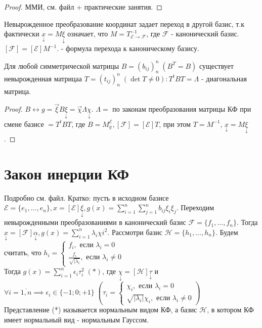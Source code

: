 \documentclass[../main.tex]{subfiles}
\begin{document}
\begin{proof}
    ММИ, см. файл + практические занятия.
\end{proof}
\begin{corollary}
    Невырожденное преобразование координат задает переход в другой базис, т.к фактически  $\underset{\downarrow}{x} = M \underset{\downarrow}{\xi}$ означает, что $M = T_{\mathcal{E}\to\mathcal{F}}^{-1}$, где $\mathcal{F}$ - канонический базис. $[\mathcal{F}] = [\mathcal{E}] M^{-1}$. - формула перехода к каноническому базису.
\end{corollary}
\begin{corollary}
    Для любой симметрической матрицы $B = (b_{ij})^{n}_{n} \; (B^{T} = B)$ существует невырожденная матрицаа $T = (t_{ij})^{n}_{n} \; (\det{T}\neq 0): T^{t}BT = \Lambda$ - диагональная матрица.
\end{corollary}
\begin{proof}
    $B\leftrightarrow g = \vec{\xi}B \underset{\downarrow}{\xi} = \vec{\chi}\Lambda \underset{\downarrow}{\chi}$. $\Lambda =$ по законам преобразования матрицы КФ при смене базисе $= T^{t}BT$, где $B = M_{g}^{\mathcal{E}}, [\mathcal{F}] = [\mathcal{E}] T$, при этом $T= M^{-1}$, $\underset{\downarrow}{x}= M\underset{\downarrow}{\xi}$.
\end{proof}
\section{Закон инерции КФ}
Подробно см. файл. Кратко: пусть в исходном базисе $\mathcal{E}=\{e_{1},\dots,e_{n}\}, x=[\mathcal{E}]\underset{\downarrow}{\xi}, g(x) = \sum_{i  =1}^{n}\sum_{j=1}^{n} b_{ij}\xi_{i}\xi_{j}$. Переходим невырожденными преобразованиями в канонический базис $\mathcal{F}=\{f_{1},\dots,f_{n}\}$. Тогда $\underset{\downarrow}{x}=[\mathcal{F}]\underset{\downarrow}{\alpha}, g(x) = \sum_{i   =1}^{n} \lambda_{i}\chi{i}^{2}$. 
Рассмотри базис $\mathcal{H} = \{h_{1},\dots,h_{n}\}$. Будем считать, что $h_{i} = \begin{cases}
    f_{i}, \text{ если } \lambda_{i} =0 \\ 
    \frac{f_{i}}{\sqrt{|\lambda_{i}}}, \text{ если } \lambda_{i} \neq 0
\end{cases}$  \\ Тогда $g(x) =\sum_{i   =1}^{n} \epsilon_{i}\tau_{i}^{2}\;(*)$, где $ \underset{\downarrow}{\chi} = [\mathcal{H}]\underset{\downarrow}{\tau} $ и $\forall i=\overline{1,n} \implies \epsilon_{i} \in \{-1;0;+1\}\; \left(\tau_{i} = \begin{cases}
    \chi_{i}, \text{ если } \lambda_{i} = 0 \\ 
    \sqrt{|\lambda_{i}|}\chi_{i}, \text{ если } \lambda_{i} \neq 0
\end{cases}\right)$
\\Представление (*) называется нормальным видом КФ, а базис $\mathcal{H}$, в котором КФ имеет нормальный вид - нормальным Гауссом. 
\end{document}
